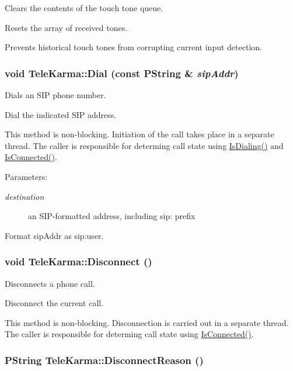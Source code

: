Clears the contents of the touch tone queue. 

Resets the array of received tones.

Prevents historical touch tones from corrupting current input detection. \hypertarget{classTeleKarma_2fe3ca9129b35b8543a1ecdb88740e3d}{
\subsubsection[{Dial}]{\setlength{\rightskip}{0pt plus 5cm}void TeleKarma::Dial (const PString \& {\em sipAddr})}}
\label{classTeleKarma_2fe3ca9129b35b8543a1ecdb88740e3d}


Dials an SIP phone number. 

Dial the indicated SIP address.

This method is non-blocking. Initiation of the call takes place in a separate thread. The caller is responsible for determing call state using \hyperlink{classTeleKarma_4c060e114d5e1d4f7ec2b4532a843443}{IsDialing()} and \hyperlink{classTeleKarma_d971a263dc085039322afa915a6ff350}{IsConnected()}. \begin{Desc}
\item[Parameters:]
\begin{description}
\item[{\em destination}]an SIP-formatted address, including sip: prefix\end{description}
\end{Desc}
Format sipAddr as sip:user. \hypertarget{classTeleKarma_318d959306b0c1e5a39c531be100387c}{
\subsubsection[{Disconnect}]{\setlength{\rightskip}{0pt plus 5cm}void TeleKarma::Disconnect ()}}
\label{classTeleKarma_318d959306b0c1e5a39c531be100387c}


Disconnects a phone call. 

Disconnect the current call.

This method is non-blocking. Disconnection is carried out in a separate thread. The caller is responsible for determing call state using \hyperlink{classTeleKarma_d971a263dc085039322afa915a6ff350}{IsConnected()}.\hypertarget{classTeleKarma_be2a73dfd1cdae97ef435325ab74c7db}{
\subsubsection[{DisconnectReason}]{\setlength{\rightskip}{0pt plus 5cm}PString TeleKarma::DisconnectReason ()}}
\label{classTeleKarma_be2a73dfd1cdae97ef435325ab74c7db}


